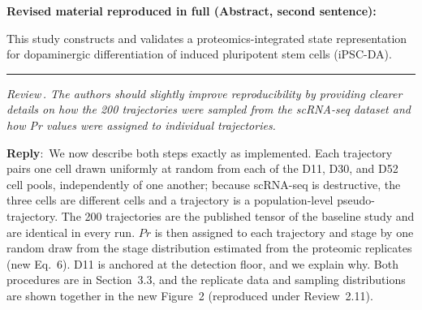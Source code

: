 \documentclass[11pt]{article}
\newcounter{reviewer}
\newcounter{point}[reviewer]
\renewcommand{\thepoint}{Review\,\thereviewer.\arabic{point}}
\newcommand{\point}[1]{\refstepcounter{point}  \bigskip \hrule \medskip \noindent \textit{{\fontseries{b}\selectfont \thepoint } #1}\par}
\newcommand{\reply}{\medskip \noindent \textbf{Reply}:\ }
\newcommand{\revisedheading}[1]{\medskip\noindent\textbf{Revised material
  reproduced in full (#1):}\par}
\newenvironment{revised}{\par\color{red}}{\par}
\begin{document}
\revisedheading{Abstract, second sentence}
\begin{revised}
This study constructs and validates a proteomics-integrated state representation for dopaminergic differentiation of induced pluripotent stem cells (iPSC-DA).
\end{revised}

\point{The authors should slightly improve reproducibility by providing clearer details on how the 200 trajectories were sampled from the scRNA-seq dataset and how Pr values were assigned to individual trajectories.}

\reply{We now describe both steps exactly as implemented. Each trajectory pairs one cell drawn uniformly at random from each of the D11, D30, and D52 cell pools, independently of one another; because scRNA-seq is destructive, the three cells are different cells and a trajectory is a population-level pseudo-trajectory. The 200 trajectories are the published tensor of the baseline study and are identical in every run. $Pr$ is then assigned to each trajectory and stage by one random draw from the stage distribution estimated from the proteomic replicates (new Eq.~6). D11 is anchored at the detection floor, and we explain why. Both procedures are in Section~3.3, and the replicate data and sampling distributions are shown together in the new Figure~2 (reproduced under Review~2.11).}
\end{document}
